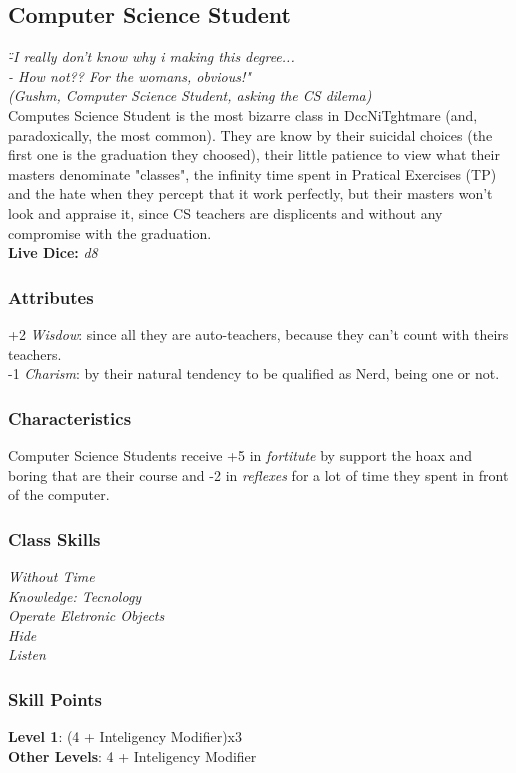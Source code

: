 \documentclass[ letterpaper,12pt]{article}
\begin{document}
\subsection{Computer Science Student}
{\it 
\"-I really don't know why i making this degree...\\
- How not?? For the womans, obvious!"\\
(Gushm, Computer Science Student, asking the CS dilema)}\\

Computes Science Student is the most bizarre class in DccNiTghtmare (and, paradoxically, the most common). They are know by their suicidal choices (the first one is the graduation they choosed), their little patience to view what their masters denominate "classes", the infinity time spent in Pratical Exercises (TP) and the hate when they percept that it work perfectly, but their masters won't look and appraise it, since CS teachers are displicents and without any compromise with the graduation.\\

{\bf Live Dice:} {\it d8}

\subsubsection{Attributes}
+2 {\it Wisdow}: since all they are auto-teachers, because they can't count with theirs teachers.\\
-1 {\it Charism}: by their natural tendency to be qualified as Nerd, being one or not.

\subsubsection{Characteristics}
Computer Science Students receive +5 in {\it fortitute} by support the hoax and boring that are their course and -2 in {\it reflexes} for a lot of time they spent in front of the computer.

\subsubsection{Class Skills}
{\it
Without Time\\
Knowledge: Tecnology\\
Operate Eletronic Objects\\
Hide\\
Listen\\}

\subsubsection{Skill Points}
{\bf Level 1}: (4 + Inteligency Modifier)x3\\
{\bf Other Levels}: 4 + Inteligency Modifier\\
\end{document}
